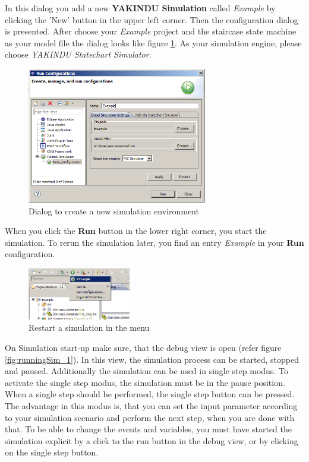 In this dialog you add a new \textbf{YAKINDU Simulation} called \textit{Example}
by clicking the 'New' button in the upper left corner. Then the configuration
dialog is presented. After choose your \textit{Example} project and the staircase
state machine as your model file the dialog looks like figure
\ref{fig:SimulationCreation}. As your simulation engine, please choose
\textit{YAKINDU Statechart Simulator}.

\begin{figure}[ht]
\center \includegraphics[width=0.7\textwidth]{./Pictures/SimulationCreation}
\caption{\label{fig:SimulationCreation}Dialog to create a new simulation environment}
\end{figure}

When you click the \textbf{Run} button in the lower right corner, you start the
simulation. To rerun the simulation later, you find an entry \textit{Example} in
your \textbf{Run} configuration.

\begin{figure}[ht] \center
\includegraphics[width=0.4\textwidth]{./Pictures/runLater_1}
\caption{\label{fig:runLater}Restart a simulation in the menu}
\end{figure}

On Simulation start-up make sure, that the debug view is open (refer figure
\ref{fig:runningSim_1}). In this view, the simulation process can be started,
stopped and paused. Additionally the simulation can be used in single step modus.
To activate the single step modus, the simulation must be in the pause position.
When a single step should be performed, the single step button can be pressed.
The advantage in this modus is, that you can set the input parameter according to
your simulation scenario and perform the next step, when you are done with that.
To be able to change the events and variables, you must have started the
simulation explicit by a click to the run button in the debug view, or by
clicking on the single step button.

